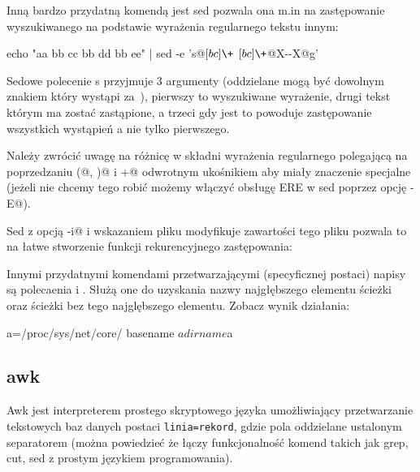 \documentclass{pdfBooklets}
\begin{document}
Inną bardzo przydatną komendą jest sed pozwala ona m.in na zastępowanie
wyszukiwanego na podstawie wyrażenia regularnego tekstu innym:
\begin{CodeFrame*}[bash]{}
echo "aa bb cc bb dd bb ee" | sed -e 's@\([bc]\+\) \([bc]\+\)@X-\2-X@g'
\end{CodeFrame*}

Sedowe polecenie s przyjmuje 3 argumenty (oddzielane mogą być dowolnym znakiem który wystąpi za~\Verb@s@),
pierwszy to wyszukiwane wyrażenie, drugi tekst którym ma zostać zastąpione,
a trzeci gdy jest \Verb@g@ to powoduje zastępowanie wszystkich wystąpień a nie tylko pierwszego.

Należy zwrócić uwagę na różnicę w składni wyrażenia regularnego polegającą na poprzedzaniu
\Verb@(@, \Verb@)@ i \Verb@+@ odwrotnym ukośnikiem aby miały znaczenie specjalne
(jeżeli nie chcemy tego robić możemy włączyć obsługę ERE w sed poprzez opcję \Verb@-E@).

Sed z opcją \Verb@-i@ i wskazaniem pliku modyfikuje zawartości tego pliku pozwala to na łatwe stworzenie funkcji rekurencyjnego zastępowania:

Innymi przydatnymi komendami przetwarzającymi (specyficznej postaci) napisy są polecaenia \Verb@basename@ i \Verb@dirname@.
Służą one do uzyskania nazwy najgłębszego elementu ścieżki oraz ścieżki bez tego najglębszego elementu. Zobacz wynik działania:
\begin{CodeFrame*}[bash]{}
a=/proc/sys/net/core/
basename $a
dirname $a
\end{CodeFrame*}

\subsection{awk}

Awk jest interpreterem prostego skryptowego języka umożliwiający przetwarzanie tekstowych baz danych postaci \texttt{linia=rekord}, gdzie pola oddzielane ustalonym separatorem (można powiedzieć że łączy funkcjonalność komend takich jak grep, cut, sed z prostym językiem programowania).

\end{document}
